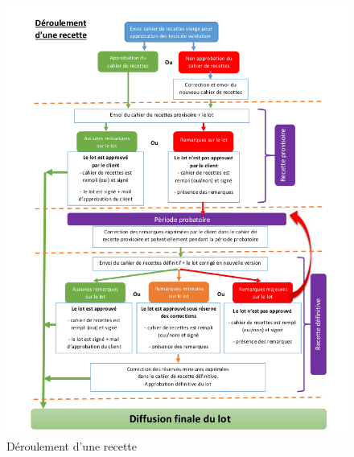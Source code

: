 \begin{figure}[H]
	\centering
	\includegraphics[scale=0.72]{images/deroulementDUneRecette.png}
	\caption{Déroulement d'une recette}
	\label{deroulementDUneRecetteImage}
\end{figure}


